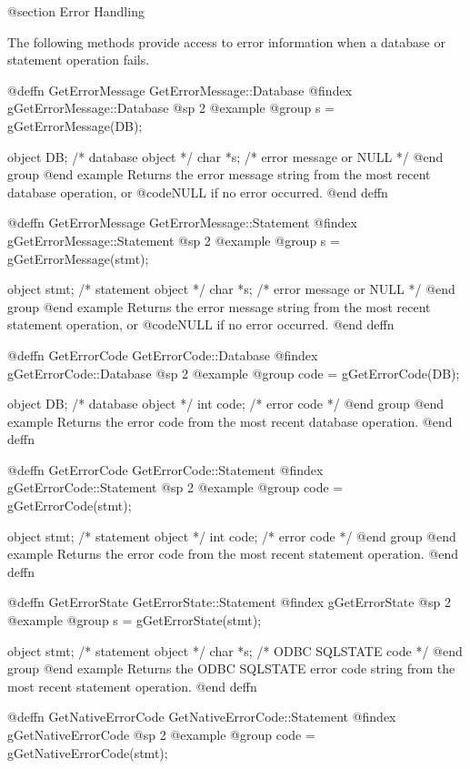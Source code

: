 @section Error Handling

The following methods provide access to error information when a
database or statement operation fails.


@deffn {GetErrorMessage} GetErrorMessage::Database
@findex gGetErrorMessage::Database
@sp 2
@example
@group
s = gGetErrorMessage(DB);

object  DB;    /*  database object          */
char    *s;    /*  error message or NULL    */
@end group
@end example
Returns the error message string from the most recent database
operation, or @code{NULL} if no error occurred.
@end deffn



@deffn {GetErrorMessage} GetErrorMessage::Statement
@findex gGetErrorMessage::Statement
@sp 2
@example
@group
s = gGetErrorMessage(stmt);

object  stmt;   /*  statement object         */
char    *s;     /*  error message or NULL    */
@end group
@end example
Returns the error message string from the most recent statement
operation, or @code{NULL} if no error occurred.
@end deffn



@deffn {GetErrorCode} GetErrorCode::Database
@findex gGetErrorCode::Database
@sp 2
@example
@group
code = gGetErrorCode(DB);

object  DB;     /*  database object  */
int     code;   /*  error code       */
@end group
@end example
Returns the error code from the most recent database operation.
@end deffn



@deffn {GetErrorCode} GetErrorCode::Statement
@findex gGetErrorCode::Statement
@sp 2
@example
@group
code = gGetErrorCode(stmt);

object  stmt;   /*  statement object  */
int     code;   /*  error code        */
@end group
@end example
Returns the error code from the most recent statement operation.
@end deffn



@deffn {GetErrorState} GetErrorState::Statement
@findex gGetErrorState
@sp 2
@example
@group
s = gGetErrorState(stmt);

object  stmt;   /*  statement object    */
char    *s;     /*  ODBC SQLSTATE code  */
@end group
@end example
Returns the ODBC SQLSTATE error code string from the most recent
statement operation.
@end deffn



@deffn {GetNativeErrorCode} GetNativeErrorCode::Statement
@findex gGetNativeErrorCode
@sp 2
@example
@group
code = gGetNativeErrorCode(stmt);

